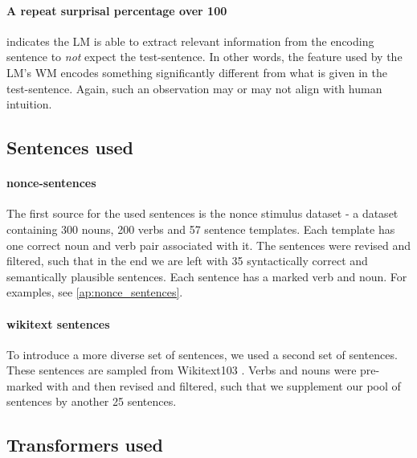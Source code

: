 \paragraph{A repeat surprisal percentage over 100}
indicates the LM is able to extract relevant information from the encoding sentence to \textit{not} expect the test-sentence. In other words, the feature used by the LM's WM encodes something significantly different from what is given in the test-sentence. Again, such an observation may or may not align with human intuition.


\subsection{Sentences used}\label{met:sentences_used}

\paragraph{nonce-sentences}
The first source for the used sentences is the nonce stimulus dataset \cite{wei_frequency_2021} - a dataset containing 300 nouns, 200 verbs and 57 sentence templates.
Each template has one correct noun and verb pair associated with it.
The sentences were revised and filtered, such that in the end we are left with 35 syntactically correct and semantically plausible sentences.
Each sentence has a marked verb and noun. For examples, see \ref{ap:nonce_sentences}.

\paragraph{wikitext sentences}
To introduce a more diverse set of sentences, we used a second set of sentences.
These sentences are sampled from Wikitext103 \parencite{merity_pointer_2016}.
Verbs and nouns were pre-marked with \parencite{van_nguyen_trankit_2021} and then revised and filtered, such that we supplement our pool of sentences by another 25 sentences.

\subsection{Transformers used}

